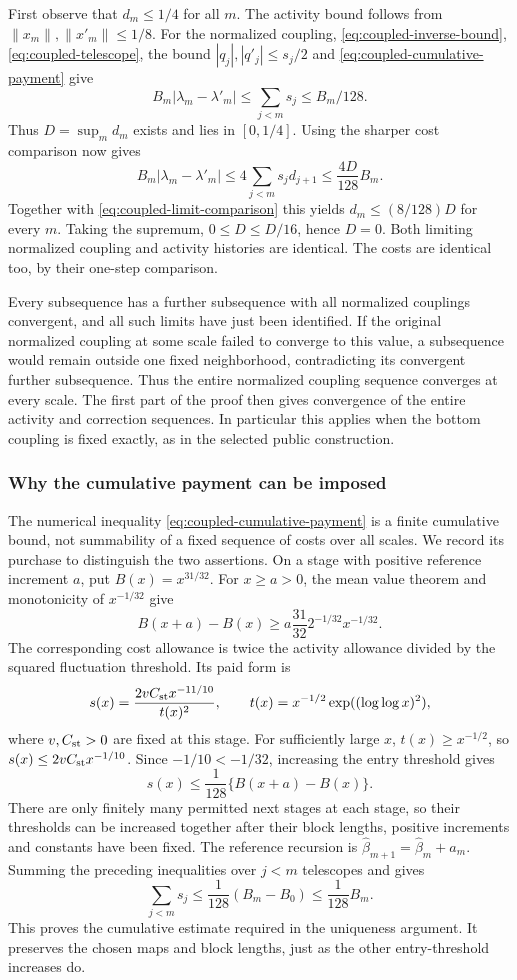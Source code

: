 First observe that $d_m\le1/4$ for all $m$. The activity bound
follows from $\|x_m\|,\|x'_m\|\le1/8$. For the normalized
coupling, \eqref{eq:coupled-inverse-bound},
\eqref{eq:coupled-telescope}, the bound $|q_j|,|q'_j|\le s_j/2$
and \eqref{eq:coupled-cumulative-payment} give
\[
 B_m|\lambda_m-\lambda'_m|\le\sum_{j<m}s_j
                         \le B_m/128.
\]
Thus $D=\sup_m d_m$ exists and lies in $[0,1/4]$.
Using the sharper cost comparison now gives
\[
 B_m|\lambda_m-\lambda'_m|
 \le4\sum_{j<m}s_jd_{j+1}
 \le\frac{4D}{128}B_m.
\]
Together with \eqref{eq:coupled-limit-comparison} this yields
$d_m\le(8/128)D$ for every $m$. Taking the supremum,
$0\le D\le D/16$, hence $D=0$. Both limiting normalized
coupling and activity histories are identical. The costs are
identical too, by their one-step comparison.

Every subsequence has a further subsequence with all normalized
couplings convergent, and all such limits have just been identified.
If the original normalized coupling at some scale failed to
converge to this value, a subsequence would remain outside one
fixed neighborhood, contradicting its convergent further
subsequence. Thus the entire normalized coupling sequence
converges at every scale. The first part of the proof then gives
convergence of the entire activity and correction sequences.
In particular this applies when the bottom coupling is fixed
exactly, as in the selected public construction.

\subsubsection{Why the cumulative payment can be imposed}
The numerical inequality \eqref{eq:coupled-cumulative-payment}
is a finite cumulative bound, not summability of a fixed sequence
of costs over all scales. We record its purchase to distinguish
the two assertions. On a stage with positive reference increment
$a$, put $B(x)=x^{31/32}$. For $x\ge a>0$, the mean value theorem
and monotonicity of $x^{-1/32}$ give
\[
 B(x+a)-B(x)\ge a\frac{31}{32}2^{-1/32}x^{-1/32}.
\]
The corresponding cost allowance is twice the activity allowance
divided by the squared fluctuation threshold. Its paid form is
\[
 s(x)=\frac{2vC_{\rm st}x^{-11/10}}{t(x)^2},\qquad
 t(x)=x^{-1/2}\exp((\log\log x)^2),
\]
where $v,C_{\rm st}>0$ are fixed at this stage. For sufficiently
large $x$, $t(x)\ge x^{-1/2}$, so
$s(x)\le2vC_{\rm st}x^{-1/10}$. Since
$-1/10<-1/32$, increasing the entry threshold gives
\[
                s(x)\le\frac1{128}\{B(x+a)-B(x)\}.
\]
There are only finitely many permitted next stages at each stage,
so their thresholds can be increased together after their block
lengths, positive increments and constants have been fixed.
The reference recursion is
$\widehat\beta_{m+1}=\widehat\beta_m+a_m$.
Summing the preceding inequalities over $j<m$ telescopes and gives
\[
 \sum_{j<m}s_j\le\frac1{128}(B_m-B_0)\le\frac1{128}B_m.
\]
This proves the cumulative estimate required in the uniqueness
argument. It preserves the chosen maps and block lengths, just
as the other entry-threshold increases do.
